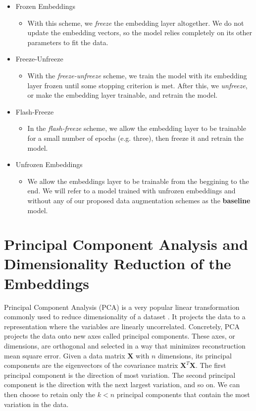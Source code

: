 \begin{itemize}
  \item{Frozen Embeddings}
  \begin{itemize}
    \item{With this scheme, we \textit{freeze} the embedding layer altogether. We do not update
    the embedding vectors, so the model relies completely on its other parameters to fit the data.}
  \end{itemize}
  \item{Freeze-Unfreeze}
  \begin{itemize}
    \item{With the \textit{freeze-unfreeze} scheme, we train the model with its embedding layer frozen until some
    stopping criterion is met. After this, we \textit{unfreeze}, or make the
    embedding layer trainable, and retrain the model.}
  \end{itemize}
  \item{Flash-Freeze}
  \begin{itemize}
    \item{In the \textit{flash-freeze} scheme, we allow the embedding layer to be trainable for a small number of
    epochs (e.g. three), then freeze it and retrain the model.}
  \end{itemize}
  \item{Unfrozen Embeddings}
  \begin{itemize}
    \item{We allow the embeddings layer to be trainable from the beggining to the end.
    We will refer to a model trained with unfrozen embeddings and without any of our proposed data augmentation schemes as the \textbf{baseline} model.}
  \end{itemize}
\end{itemize}

\section{Principal Component Analysis and Dimensionality Reduction of the Embeddings}
Principal Component Analysis (PCA) is a very popular linear transformation commonly used to reduce dimensionality of a dataset \cite{DBLP:journals/corr/Shlens14}.
It projects the data to a representation where the variables are linearly uncorrelated. Concretely, PCA projects the data onto new axes called principal
components. These axes, or dimensions, are orthogonal and selected in a way that minimizes reconstruction mean square error.
Given a data matrix $\bm{X}$ with $n$ dimensions, its principal components are the eigenvectors of the covariance matrix $\bm{X}^T\bm{X}$.
The first principal component is the direction of most variation. The second principal component is the direction with the next largest variation,
and so on. We can then choose to retain only the $k<n$ principal components that contain the most variation in the data.

